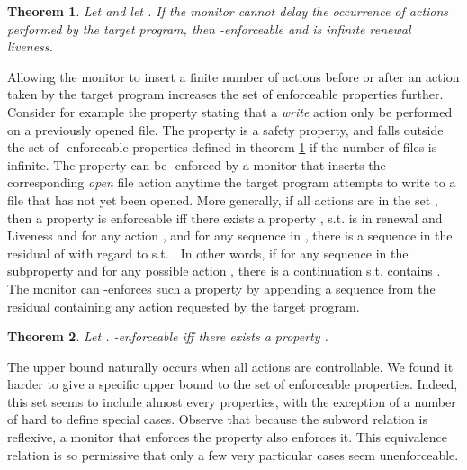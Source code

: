\documentclass[12pt]{article}
\newtheorem{thm}{Theorem}
\begin{document}
\begin{thm}\label{thm:strictInsert}
Let  and let . If the monitor cannot delay the occurrence of actions performed by the target program, then  -enforceable   and  is infinite renewal  liveness.
\end{thm}


Allowing the monitor to insert a finite number of actions  before or after an action taken by the target program increases the set of enforceable  properties further. Consider for example the property \Property  stating that a \textit{write} action only be performed on a previously opened file. The property is a safety property, and falls outside the set of -enforceable properties defined in theorem \ref{thm:strictInsert} if the number of files is infinite. The property can be  -enforced  by a monitor that inserts the corresponding \textit{open} file action anytime the target program attempts to write to a file that has not yet been opened. More generally, if all actions are in the set , then a property  is enforceable iff there exists a property , s.t.  is in renewal and Liveness and for any action , and for any sequence  in , there is a sequence  in the residual of  with regard to  s.t. . In other words, if for any sequence in the subproperty  and for any possible action , there is a continuation  s.t.  contains . The monitor can -enforces such a property by appending a sequence from the residual containing any action requested by the target program.

\begin{thm}
Let  .   -enforceable iff there exists a property .
\end{thm}

The upper bound naturally occurs when all actions are controllable. We found it harder to give a specific upper bound to the set of enforceable properties.  Indeed, this set seems to include almost every properties, with the exception of a number of hard to define special cases. Observe that because the subword relation is reflexive, a monitor that enforces the property also enforces it. This equivalence relation is so permissive that only a few very particular cases seem unenforceable.
\end{document}
